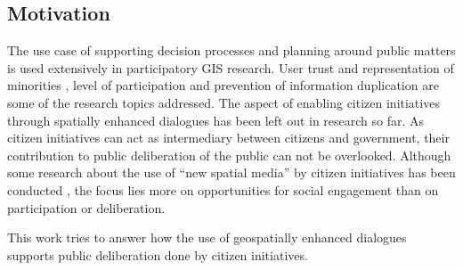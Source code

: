 
\subsection{Motivation}
The use case of supporting decision processes and planning around public matters is used extensively in participatory GIS research. User trust and representation of minorities \cite{Carver2001_PPGIS_Cyberdemocracy}, level of participation \cite{Steinmann2005_Combination_Ladder_GIS} and prevention of information duplication \cite{Hopfer2007_Communication} are some of the research topics addressed. The aspect of enabling citizen initiatives through spatially enhanced dialogues has been left out in research so far. As citizen initiatives can act as intermediary between citizens and government, their contribution to public deliberation of the public can not be overlooked. Although some research about the use of ``new spatial media'' by citizen initiatives has been conducted \cite{Elwood2013_NewSpatialMedia}, the focus lies more on opportunities for social engagement than on participation or deliberation.

This work tries to answer how the use of geospatially enhanced dialogues supports public deliberation done by citizen initiatives.
